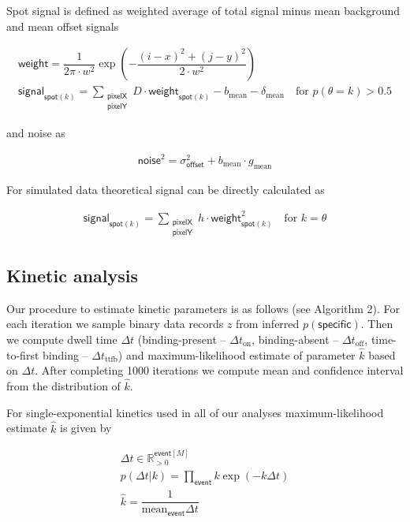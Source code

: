Spot signal is defined as weighted average of total signal minus mean background and mean offset signals

\begin{gather*}
    \mathsf{weight} = \dfrac{1}{2 \pi \cdot w^2} \exp{\left( -\dfrac{(i-x)^2 + (j-y)^2}{2 \cdot w^2} \right)} \\
    \mathsf{signal}_{\mathsf{spot}(k)} =  \sum_{\substack{\mathsf{pixelX} \\ \mathsf{pixelY}}} D \cdot \mathsf{weight}_{\mathsf{spot}(k)} - b_{\mathrm{mean}} - \delta_\mathrm{mean} \quad \textrm{for } p(\theta = k) > 0.5
\end{gather*}

\noindent and noise as

\begin{gather*}
    \mathsf{noise}^2 = \sigma^2_{\mathsf{offset}} + b_\mathrm{mean} \cdot g_\mathrm{mean}
\end{gather*}

For simulated data theoretical signal can be directly calculated as

\begin{gather*}
    \mathsf{signal}_{\mathsf{spot}(k)} =  \sum_{\substack{\mathsf{pixelX} \\ \mathsf{pixelY}}} h \cdot \mathsf{weight}_{\mathsf{spot}(k)}^2 \quad \textrm{for } k = \theta
\end{gather*}

\subsection*{Kinetic analysis}

Our procedure to estimate kinetic parameters is as follows (see Algorithm 2). For each iteration we sample binary data records $z$ from inferred $p(\mathsf{specific})$. Then we compute dwell time $\Delta t$ (binding-present -- $\Delta t_\mathrm{on}$, binding-absent -- $\Delta t_\mathrm{off}$, time-to-first binding -- $\Delta t_\mathrm{ttfb}$) and maximum-likelihood estimate of parameter $\hat{k}$ based on $\Delta t$. After completing 1000 iterations we compute mean and confidence interval from the distribution of $\hat{k}$.

For single-exponential kinetics used in all of our analyses maximum-likelihood estimate $\hat{k}$ is given by

\begin{gather*}
    \Delta t \in \mathbb{R}_{>0}^{\mathsf{event}[M]} \\
    p(\Delta t | k) = \prod_\mathsf{event} k \exp (- k \Delta t) \\
    \hat{k} = \dfrac{1}{\mathrm{mean}_{\mathsf{event}} \Delta t}
\end{gather*}

